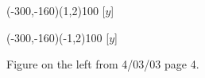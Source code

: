 \documentclass[12pt]{article}
\newcommand{\s}{\vspace{5mm}}
\begin{document}
\begin{figure}[htb]
\begin{egame}
\putbranch(-300,-160)(1,2){100}
[$y$]

\renewcommand{\egarrowstyle}{e}

\putbranch(-300,-160)(-1,2){100}
[$y$]


%
\end{egame}
\hspace*{\fill}\s\s\s\s\s\s\s\s\s
\caption[]{Figure on the left from 4/03/03 page 4.}\label{f:two}
\end{figure}
\end{document}
